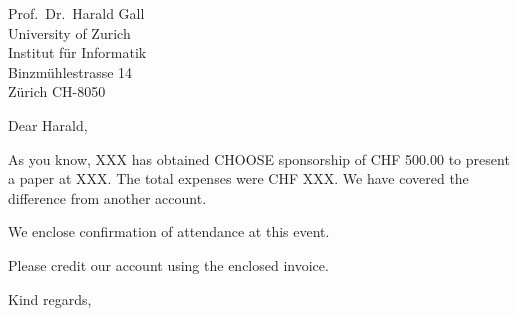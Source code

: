 \documentclass[12pt]{unibeLetter}
\begin{document}
\begin{letter}{
Prof.\ Dr.\ Harald Gall\\
University of Zurich\\
Institut für Informatik\\
Binzmühlestrasse 14\\
Zürich  CH-8050
}
\date{Bern, XXX}
\opening{Dear Harald,}

As you know, XXX has obtained CHOOSE sponsorship of CHF 500.00 to present a paper at XXX. The total expenses were CHF XXX. We have covered the difference from another account.

We enclose confirmation of attendance at this event. 

Please credit our account using the enclosed invoice. 

\closing{Kind regards,}
\end{letter}
\end{document}

